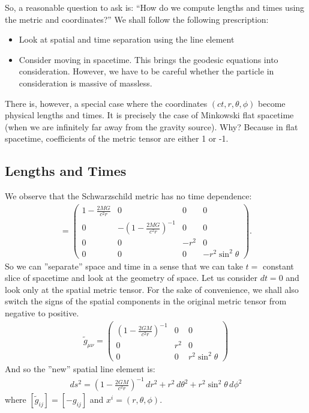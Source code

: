 \documentclass{book}
\theoremstyle{definition}
\begin{document}
So, a reasonable question to ask is: ``How do we compute lengths and times using the metric and coordinates?'' We shall follow the following prescription:
\begin{itemize}
	\item Look at spatial and time separation using the line element
	\item Consider moving in spacetime. This brings the geodesic equations into consideration. However, we have to be careful whether the particle in consideration is massive of massless.
\end{itemize}

There is, however, a special case where the coordinates $(ct, r, \theta, \phi)$ become physical lengths and times. It is precisely the case of Minkowski flat spacetime (when we are infinitely far away from the gravity source). Why? Because in flat spacetime, coefficients of the metric tensor are either 1 or -1.

\subsection{Lengths and Times}
We observe that the Schwarzschild metric has no time dependence:
\begin{align*}
[g_{\mu\nu}]
	=
	\begin{pmatrix}
	1 - \frac{2MG}{c^2r} & 0 & 0 & 0\\
	0 & -\left(1 - \frac{2MG}{c^2r} \right) ^{-1} & 0 & 0\\
	0 & 0 & -r^2 & 0\\
	0 & 0 & 0 & -r^2\sin^2\theta
	\end{pmatrix}.
\end{align*}
So we can ''separate'' space and time in a sense that we can take $t=$ constant slice of spacetime and look at the geometry of space. Let us consider $dt = 0$ and look only at the spatial metric tensor. For the sake of convenience, we shall also switch the signs of the spatial components in the original metric tensor from negative to positive. 
\begin{align*}
\tilde{g}_{\mu\nu} = 
\begin{pmatrix}
\left( 1 - \frac{2GM}{c^2r}\right)^{-1} & 0 & 0\\
0 & r^2 & 0\\
0 & 0 & r^2\sin^2\theta 
\end{pmatrix}
\end{align*} 
And so the ''new'' spatial line element is:
\begin{align*}
ds^2 = \left( 1 - \frac{2GM}{c^2r}\right)^{-1}\,dr^2 + r^2\,d\theta^2 + r^2\sin^2\theta\,d\phi^2
\end{align*}
where $[\tilde{g}_{ij}] = [-g_{ij}]$ and $x^i = (r,\theta,\phi) $. \\
\end{document}
